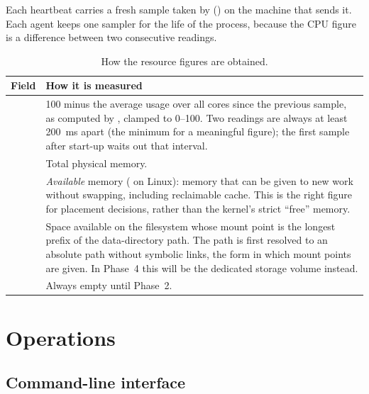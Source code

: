 \documentclass{article}
\begin{document}
Each heartbeat carries a fresh sample taken by 
() on the machine that sends it. Each agent keeps one
sampler for the life of the process, because the CPU figure is a
difference between two consecutive readings.

\begin{table}[htbp]
  \centering
  \begin{tabular}{L{0.24\textwidth}L{0.64\textwidth}}
    \hline
    Field & How it is measured \\
    \hline
      & 100 minus the average usage over all cores since the previous
        sample, as computed by , clamped to 0--100. Two
        readings are always at least 200~ms apart (the minimum for a
        meaningful figure); the first sample after start-up waits out
        that interval. \\
      & Total physical memory. \\
      & \emph{Available} memory ( on Linux): memory
        that can be given to new work without swapping, including
        reclaimable cache. This is the right figure for placement
        decisions, rather than the kernel's strict ``free'' memory. \\
      & Space available on the filesystem whose mount point is the longest
        prefix of the data-directory path. The path is first resolved to
        an absolute path without symbolic links, the form in which mount
        points are given. In Phase~4 this will be the dedicated storage
        volume instead. \\
      & Always empty until Phase~2. \\
    \hline
  \end{tabular}
  \caption{How the resource figures are obtained.}
  \label{tab:telemetry}
\end{table}

\section{Operations}

\subsection{Command-line interface}
\end{document}
